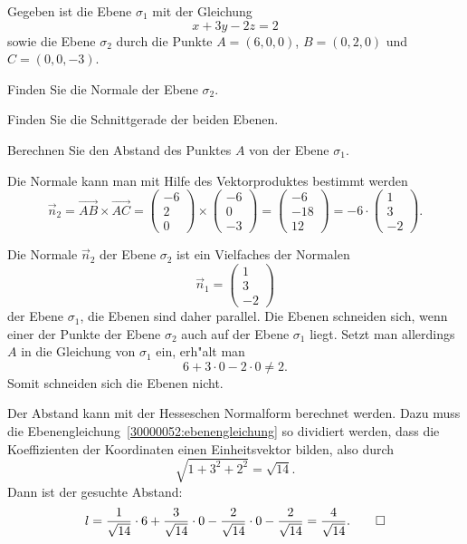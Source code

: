 Gegeben ist die Ebene $\sigma_1$ mit der Gleichung
\begin{equation}
x+3y-2z=2
\label{30000052:ebenengleichung}
\end{equation}
sowie die Ebene $\sigma_2$ durch die Punkte $A=(6,0,0)$, $B=(0,2,0)$ und
$C=(0,0,-3)$.
\begin{teilaufgaben}
\item
Finden Sie die Normale der Ebene $\sigma_2$.
\item 
Finden Sie die Schnittgerade der beiden Ebenen.
\item 
Berechnen Sie den Abstand des Punktes $A$ von der Ebene $\sigma_1$.
\end{teilaufgaben}

\begin{loesung}
\begin{teilaufgaben}
\item
Die Normale kann man mit Hilfe des Vektorproduktes bestimmt werden
\[
\vec{n}_2
=
\overrightarrow{AB}\times\overrightarrow{AC}
=
\begin{pmatrix}
-6\\
 2\\
 0
\end{pmatrix}
\times
\begin{pmatrix}
-6\\
 0\\
-3
\end{pmatrix}
=
\begin{pmatrix}
-6\\
-18\\
12
\end{pmatrix}
=
-6\cdot\begin{pmatrix}
1\\
3\\
-2
\end{pmatrix}.
\]
\item
Die Normale $\vec{n}_2$ der Ebene $\sigma_2$ ist ein Vielfaches der
Normalen
\[
\vec{n}_1=\begin{pmatrix}1\\3\\-2\end{pmatrix}
\]
der Ebene $\sigma_1$, die Ebenen sind daher parallel.
Die Ebenen schneiden sich, wenn einer der Punkte der Ebene $\sigma_2$ auch
auf der Ebene $\sigma_1$ liegt. 
Setzt man allerdings $A$ in die Gleichung von $\sigma_1$ ein, erh"alt man
\[
6+3\cdot 0-2\cdot 0 \ne 2.
\]
Somit schneiden sich die Ebenen nicht.
\item
Der Abstand kann mit der Hesseschen Normalform berechnet werden.
Dazu muss die Ebenengleichung~\eqref{30000052:ebenengleichung}
so dividiert werden, dass die Koeffizienten der Koordinaten einen
Einheitsvektor bilden, also durch
\[
\sqrt{1+3^2+2^2}=\sqrt{14}.
\]
Dann ist der gesuchte Abstand:
\[
l
=
\frac1{\sqrt{14}}\cdot 6
+\frac3{\sqrt{14}}\cdot 0
-\frac2{\sqrt{14}}\cdot 0
-\frac2{\sqrt{14}}
=
\frac4{\sqrt{14}}.
\qedhere
\]
\end{teilaufgaben}
\end{loesung}

